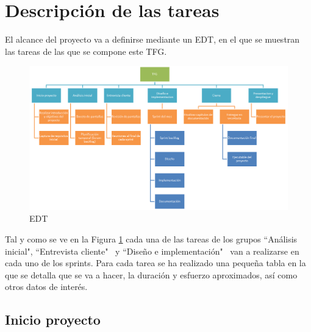 \section{Descripci\'on de las tareas}
El alcance del proyecto va a definirse mediante un EDT, en el que se muestran las tareas de las
que se compone este TFG.

\begin{figure}[h]
	\centering
	\includegraphics[width=1\linewidth]{./Figures/EDT}
	\caption[Alcance del proyecto]{EDT}
	\label{fig:Alcance}
\end{figure}
Tal y como se ve en la Figura \ref{fig:Alcance} cada una de las tareas de los grupos
``An\'alisis inicial", ``Entrevista cliente" \ y ``Dise\~no e implementaci\'on" \ van a realizarse en cada uno de los sprints.
Para cada tarea se ha realizado una peque\~na tabla en la que se detalla que se va a hacer,
la duraci\'on y esfuerzo aproximados, as\'i como otros datos de inter\'es.

\subsection{Inicio proyecto}
